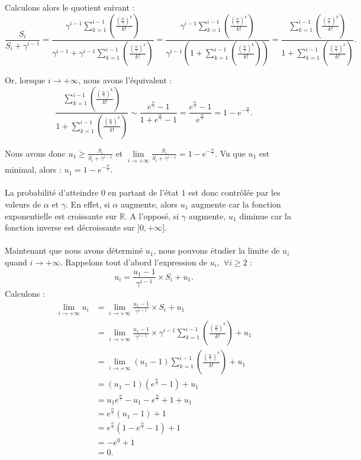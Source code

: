 \documentclass[12pt,a4paper]{report}
\theoremstyle{remark}
\begin{document}
Calculons alors le quotient suivant :
$$\frac{S_i}{S_i + \gamma^{i-1}} = \frac{\gamma^{i-1} \sum\limits_{k=1}^{i-1}\left(\frac{\left(\frac{\alpha}{\gamma}\right)^k}{k!}\right)}{\gamma^{i-1} + \gamma^{i-1} \sum\limits_{k=1}^{i-1}\left(\frac{\left(\frac{\alpha}{\gamma}\right)^k}{k!}\right)} = \frac{\gamma^{i-1} \sum\limits_{k=1}^{i-1}\left(\frac{\left(\frac{\alpha}{\gamma}\right)^k}{k!}\right)}{\gamma^{i-1} \left(1 + \sum\limits_{k=1}^{i-1}\left(\frac{\left(\frac{\alpha}{\gamma}\right)^k}{k!}\right)\right)} = \frac{\sum\limits_{k=1}^{i-1}\left(\frac{\left(\frac{\alpha}{\gamma}\right)^k}{k!}\right)}{1 + \sum\limits_{k=1}^{i-1}\left(\frac{\left(\frac{\alpha}{\gamma}\right)^k}{k!}\right)}.$$

Or, lorsque $i \rightarrow +\infty$, nous avons l'équivalent : 
$$\frac{\sum\limits_{k=1}^{i-1}\left(\frac{\left(\frac{\alpha}{\gamma}\right)^k}{k!}\right)}{1 + \sum\limits_{k=1}^{i-1}\left(\frac{\left(\frac{\alpha}{\gamma}\right)^k}{k!}\right)} \sim \frac{e^{\frac{\alpha}{\gamma}}-1}{1 + e^{\frac{\alpha}{\gamma}}-1} = \frac{e^{\frac{\alpha}{\gamma}}-1}{e^{\frac{\alpha}{\gamma}}} = 1 - e^{-\frac{\alpha}{\gamma}}.$$

Nous avons donc $u_1 \geqslant \frac{S_i}{S_i + \gamma^{i-1}}$ et $\lim\limits_{i \rightarrow +\infty} \frac{S_i}{S_i + \gamma^{i-1}} = 1 - e^{-\frac{\alpha}{\gamma}}$. Vu que $u_1$ est minimal, alors : $u_1 = 1 - e^{-\frac{\alpha}{\gamma}}.$
\\
\\
La probabilité d'atteindre $0$ en partant de l'état $1$ est donc contrôlée par les valeurs de $\alpha$ et $\gamma$. En effet, si $\alpha$ augmente, alors $u_1$ augmente car la fonction exponentielle est croissante sur $\mathbb{R}$. A l'opposé, si $\gamma$ augmente, $u_1$ diminue car la fonction inverse est décroissante sur $]0,+\infty]$.
\\
\\
Maintenant que nous avons déterminé $u_1$, nous pouvons étudier la limite de $u_i$ quand $i \rightarrow + \infty$. Rappelons tout d'abord l'expression de $u_i, \, \, \forall i \geqslant 2$ :
$$u_i = \frac{u_1 - 1}{\gamma^{i-1}} \times S_i + u_1.$$
Calculons :
\begin{align*}
\lim\limits_{i \rightarrow +\infty} u_i &= \lim\limits_{i \rightarrow +\infty} \frac{u_1 - 1}{\gamma^{i-1}} \times S_i + u_1 \\
&= \lim\limits_{i \rightarrow +\infty} \frac{u_1 - 1}{\gamma^{i-1}} \times \gamma^{i-1} \sum_{k=1}^{i-1}\left(\frac{\left(\frac{\alpha}{\gamma}\right)^k}{k!}\right) + u_1 \\
&= \lim\limits_{i \rightarrow +\infty} (u_1 - 1) \sum_{k=1}^{i-1}\left(\frac{\left(\frac{\alpha}{\gamma}\right)^k}{k!}\right) + u_1 \\
&= (u_1 - 1)(e^{\frac{\alpha}{\gamma}}-1) + u_1 \\
&= u_1 e^{\frac{\alpha}{\gamma}} - u_1 - e^{\frac{\alpha}{\gamma}} + 1 + u_1 \\
&= e^{\frac{\alpha}{\gamma}} (u_1 - 1) + 1 \\
&= e^{\frac{\alpha}{\gamma}}(1 - e^{\frac{\alpha}{\gamma}} - 1) + 1 \\
&= -e^0 + 1 \\
&= 0.
\end{align*}
\end{document}
